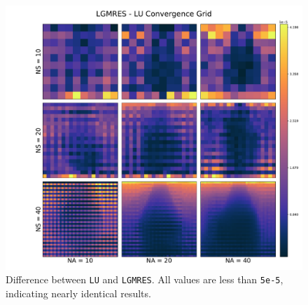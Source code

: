 \documentclass[10pt]{article}
\begin{document}
\begin{figure}[H]
	\centering
	\includegraphics[width=7in]{img/diffgrid.pdf}
	\caption{Difference between \texttt{LU} and \texttt{LGMRES}. All values are less than \texttt{5e-5}, indicating nearly identical results.}
	\label{fig:diff}
\end{figure}
\end{document}
